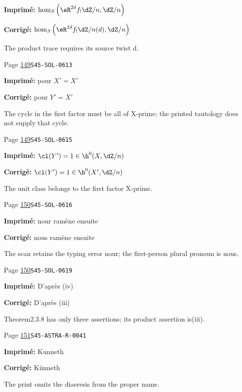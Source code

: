 \begin{description}
\par\noindent\textbf{Imprimé:} \(\hom_S\left(\eR^{2 d}f_!\dZ/n,\dZ/n\right)\)
\par\noindent\textbf{Corrigé:} \(\hom_S\left(\eR^{2 d}f_!\dZ/n(d),\dZ/n\right)\)
\par\noindent The product trace requires its source twist d.
\smallskip
\item[\hypertarget{apparatus:FR-0113}{113}] Page \hyperlink{printpage:fr:149}{149}\quad\texttt{S45-SOL-0613}
\par\noindent\textbf{Imprimé:} pour $X'=X'$
\par\noindent\textbf{Corrigé:} pour $Y'=X'$
\par\noindent The cycle in the first factor must be all of X-prime; the printed tautology does not supply that cycle.
\smallskip
\item[\hypertarget{apparatus:FR-0114}{114}] Page \hyperlink{printpage:fr:149}{149}\quad\texttt{S45-SOL-0615}
\par\noindent\textbf{Imprimé:} \(\cl(Y')=1\in \h^0(X,\dZ/n)\)
\par\noindent\textbf{Corrigé:} \(\cl(Y')=1\in \h^0(X',\dZ/n)\)
\par\noindent The unit class belongs to the first factor X-prime.
\smallskip
\item[\hypertarget{apparatus:FR-0115}{115}] Page \hyperlink{printpage:fr:150}{150}\quad\texttt{S45-SOL-0616}
\par\noindent\textbf{Imprimé:} nour ramène ensuite
\par\noindent\textbf{Corrigé:} nous ramène ensuite
\par\noindent The scan retains the typing error nour; the first-person plural pronoun is nous.
\smallskip
\item[\hypertarget{apparatus:FR-0116}{116}] Page \hyperlink{printpage:fr:150}{150}\quad\texttt{S45-SOL-0619}
\par\noindent\textbf{Imprimé:} D'après (iv)
\par\noindent\textbf{Corrigé:} D'après (iii)
\par\noindent Theorem2.3.8 has only three assertions; its product assertion is(iii).
\smallskip
\item[\hypertarget{apparatus:FR-0117}{117}] Page \hyperlink{printpage:fr:151}{151}\quad\texttt{S45-ASTRA-R-0041}
\par\noindent\textbf{Imprimé:} Kunneth
\par\noindent\textbf{Corrigé:} K\"unneth
\par\noindent The print omits the diaeresis from the proper name.

\end{description}
